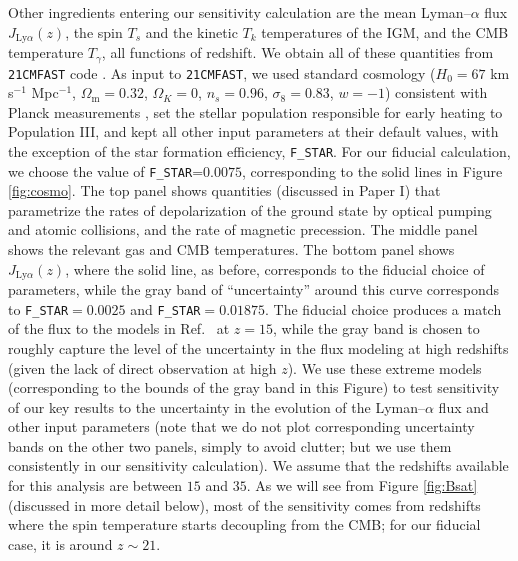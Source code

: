 Other ingredients entering our sensitivity calculation are the mean Lyman--$\alpha$ flux $J_{\text{Ly}\alpha}(z)$, the spin $T_s$ and the kinetic $T_k$ temperatures of the IGM, and the CMB temperature $T_\gamma$, all functions of redshift. We obtain all of these quantities from \texttt{21CMFAST} code \cite{2011MNRAS.411..955M}. As input to \texttt{21CMFAST}, we used standard cosmology ($H_0=67$ km s$^{-1}$ Mpc$^{-1}$, $\Omega_\text{m}=0.32$, $\Omega_K=0$, $n_s=0.96$, $\sigma_8=0.83$, $w=-1$) consistent with Planck measurements \cite{2015arXiv150201589P}, set the stellar population responsible for early heating to Population III, and kept all other input parameters at their default values, with the exception of the star formation efficiency, \verb|F_STAR|. For our fiducial calculation, we choose the value of \verb|F_STAR|=$0.0075$, corresponding to the solid lines in Figure \ref{fig:cosmo}. The top panel shows quantities (discussed in Paper I) that parametrize the rates of depolarization of the ground state by optical pumping and atomic collisions, and the rate of magnetic precession. The middle panel shows the relevant gas and CMB temperatures. The bottom panel shows $J_{\text{Ly}\alpha}(z)$, where the solid line, as before, corresponds to the fiducial choice of parameters, while the gray band of ``uncertainty'' around this curve corresponds to \verb|F_STAR|$=0.0025$ and \verb|F_STAR|$=0.01875$. The fiducial choice produces a match of the flux to the models in Ref.~\cite{2012ApJ...746..125H} at $z=15$, while the gray band is chosen to roughly capture the level of the uncertainty in the flux modeling at high redshifts (given the lack of direct observation at high $z$). We use these extreme models (corresponding to the bounds of the gray band in this Figure) to test sensitivity of our key results to the uncertainty in the evolution of the Lyman--$\alpha$ flux and other input parameters (note that we do not plot corresponding uncertainty bands on the other two panels, simply to avoid clutter; but we use them consistently in our sensitivity calculation). We assume that the redshifts available for this analysis are between $15$ and $35$. As we will see from Figure \ref{fig:Bsat} (discussed in more detail below), most of the sensitivity comes from redshifts where the spin temperature starts decoupling from the CMB; for our fiducial case, it is around $z\sim 21$. 

